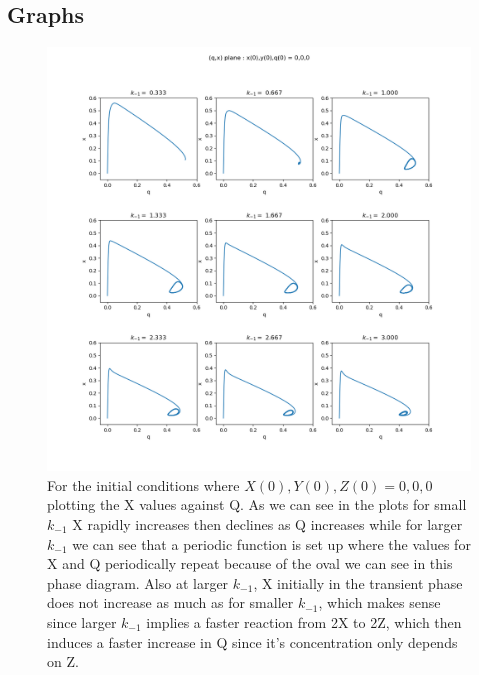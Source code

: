 \documentclass[11pt,a4paper]{CLabBookTemplate} %
\begin{document}
\subsection{Graphs}
\begin{figure}[h!]
	\centering
	\includegraphics[width = 160mm]{Figures/Task2_1.png}
	\caption{For the initial conditions where $X(0),Y(0),Z(0) = 0,0,0$ plotting the X values against Q. As we can see in the plots for small $k_{-1}$ X rapidly increases then declines as Q increases while for larger $k_{-1}$ we can see that a periodic function is set up where the values for X and Q periodically repeat because of the oval we can see in this phase diagram. Also at larger $k_{-1}$, X initially in the transient phase does not increase as much as for smaller $k_{-1}$, which makes sense since larger $k_{-1}$ implies a faster reaction from 2X to 2Z, which then induces a faster increase in Q since it's concentration only depends on Z.}
	\label{fig:Task2_1}
\end{figure}
\end{document}
